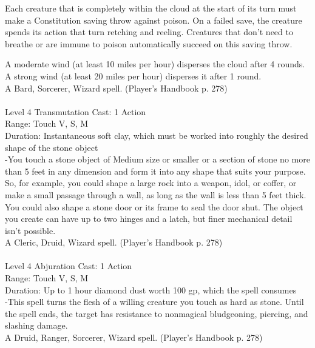 \documentclass[10pt,twocolumn]{report}
\begin{document}
Each creature that is completely within the cloud at the start of its turn must make a Constitution saving throw against poison. On a failed save, the creature spends its action that turn retching and reeling. Creatures that don’t need to breathe or are immune to poison automatically succeed on this saving throw.

A moderate wind (at least 10 miles per hour) disperses the cloud after 4 rounds. A strong wind (at least 20 miles per hour) disperses it after 1 round.\\
A Bard, Sorcerer, Wizard spell. (Player's Handbook p. 278) \\


 \\
Level 4 \quad Transmutation \quad Cast: 1 Action\\
Range: Touch \quad V, S, M\\
Duration: Instantaneous \quad soft clay, which must be worked into roughly the desired shape of the stone object\\
-You touch a stone object of Medium size or smaller or a section of stone no more than 5 feet in any dimension and form it into any shape that suits your purpose. So, for example, you could shape a large rock into a weapon, idol, or coffer, or make a small passage through a wall, as long as the wall is less than 5 feet thick. You could also shape a stone door or its frame to seal the door shut. The object you create can have up to two hinges and a latch, but finer mechanical detail isn’t possible.\\
A Cleric, Druid, Wizard spell. (Player's Handbook p. 278) \\


 \\
Level 4 \quad Abjuration \quad Cast: 1 Action\\
Range: Touch \quad V, S, M\\
Duration: Up to 1 hour \quad diamond dust worth 100 gp, which the spell consumes\\
-This spell turns the flesh of a willing creature you touch as hard as stone. Until the spell ends, the target has resistance to nonmagical bludgeoning, piercing, and slashing damage.\\
A Druid, Ranger, Sorcerer, Wizard spell. (Player's Handbook p. 278) \\
\end{document}
